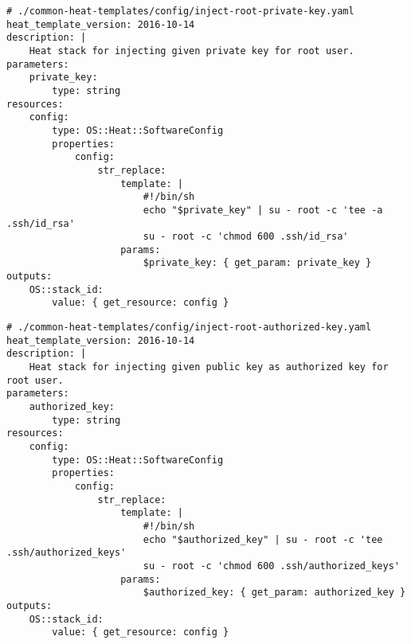 \begin{verbatim}
# ./common-heat-templates/config/inject-root-private-key.yaml
heat_template_version: 2016-10-14
description: |
    Heat stack for injecting given private key for root user.
parameters:
    private_key:
        type: string
resources:
    config:
        type: OS::Heat::SoftwareConfig
        properties:
            config:
                str_replace:
                    template: |
                        #!/bin/sh
                        echo "$private_key" | su - root -c 'tee -a .ssh/id_rsa'
                        su - root -c 'chmod 600 .ssh/id_rsa'
                    params:
                        $private_key: { get_param: private_key }
outputs:
    OS::stack_id:
        value: { get_resource: config }
\end{verbatim}

\begin{verbatim}
# ./common-heat-templates/config/inject-root-authorized-key.yaml
heat_template_version: 2016-10-14
description: |
    Heat stack for injecting given public key as authorized key for root user.
parameters:
    authorized_key:
        type: string
resources:
    config:
        type: OS::Heat::SoftwareConfig
        properties:
            config:
                str_replace:
                    template: |
                        #!/bin/sh
                        echo "$authorized_key" | su - root -c 'tee .ssh/authorized_keys'
                        su - root -c 'chmod 600 .ssh/authorized_keys'
                    params:
                        $authorized_key: { get_param: authorized_key }
outputs:
    OS::stack_id:
        value: { get_resource: config }
\end{verbatim}
